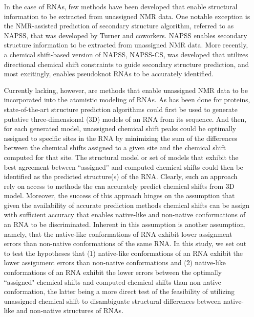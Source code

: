 \documentclass[journal=jcisd8,manuscript=article,layout=onecolumn]{achemso}
\begin{document}
In the case of RNAs, few methods have been developed that enable structural information to be extracted from unassigned NMR data. One notable exception is the NMR-assisted prediction of secondary structure algorithm, referred to as NAPSS, that was  developed by Turner and coworkers. NAPSS enables secondary structure information to be extracted from unassigned NMR data\cite{hart2008nmr}. More recently, a chemical shift-based version of NAPSS, NAPSS-CS, was developed that utilizes directional chemical shift constraints to guide secondary structure prediction, and most excitingly, enables pseudoknot RNAs to be accurately identified\cite{chen2015nuclear}. 

Currently lacking, however, are methods that enable unassigned NMR data to be incorporated into the atomistic modeling of RNAs. As has been done for proteins, state-of-the-art structure prediction algorithms could first be used to generate putative three-dimensional (3D) models of an RNA from its sequence. And then, for each generated model, unassigned chemical shift peaks could be optimally assigned to specific sites in the RNA by minimizing the sum of the differences between the chemical shifts assigned to a given site and the chemical shift computed for that site. The structural model or set of models that exhibit the best agreement between ``assigned'' and computed chemical shifts could then be identified as the predicted structure(s) of the RNA\cite{meiler2003rapid, bermejo2008deuterated, courtney2015experimental}. Clearly, such an approach rely on access to methods the can accurately predict chemical shifts from 3D model. Moreover, the success of this approach hinges on the assumption that given the availability of accurate prediction methods chemical shifts can be  assign with sufficient accuracy that enables native-like and non-native conformations of an RNA to be discriminated. Inherent in this assumption is another assumption, namely, that the native-like conformations of RNA exhibit lower assignment errors than non-native conformations of the same RNA. In this study, we set out to test the hypotheses that (1) native-like conformations of an RNA exhibit the lower assignment errors than non-native conformations and (2)  native-like conformations of an RNA exhibit the lower errors between the optimally ``assigned" chemical shifts and computed chemical shifts than non-native conformation, the latter being a more direct test of the feasibility of utilizing unassigned chemical shift to disambiguate structural differences between native-like and non-native structures of RNAs.
\end{document}
